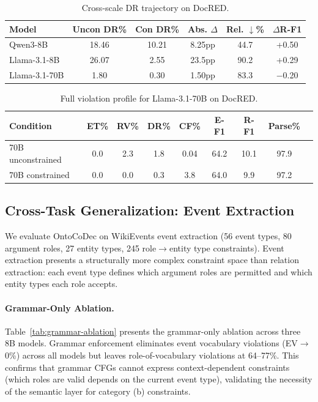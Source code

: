 \documentclass[11pt,a4paper]{article}
\begin{document}
\begin{table}[t]
\centering
\caption{Cross-scale DR trajectory on DocRED.}
\label{tab:70b-docred-trajectory}
\small
\begin{tabular}{lccccc}
\toprule
Model & Uncon DR\% & Con DR\% & Abs. $\Delta$ & Rel. $\downarrow$\% & $\Delta$R-F1 \\
\midrule
Qwen3-8B & 18.46 & 10.21 & 8.25pp & 44.7 & +0.50 \\
Llama-3.1-8B & 26.07 & 2.55 & 23.5pp & 90.2 & +0.29 \\
Llama-3.1-70B & 1.80 & 0.30 & 1.50pp & 83.3 & $-$0.20 \\
\bottomrule
\end{tabular}
\end{table}

\begin{table}[t]
\centering
\caption{Full violation profile for Llama-3.1-70B on DocRED.}
\label{tab:70b-docred-profile}
\small
\begin{tabular}{lcccccccc}
\toprule
Condition & ET\% & RV\% & DR\% & CF\% & E-F1 & R-F1 & Parse\% \\
\midrule
70B unconstrained & 0.0 & 2.3 & 1.8 & 0.04 & 64.2 & 10.1 & 97.9 \\
70B constrained & 0.0 & 0.0 & 0.3 & 3.8 & 64.0 & 9.9 & 97.2 \\
\bottomrule
\end{tabular}
\end{table}

\subsection{Cross-Task Generalization: Event Extraction}
\label{sec:ee}

We evaluate OntoCoDec on WikiEvents event extraction (56 event types, 80 argument roles, 27 entity types, 245 role$\to$entity type constraints). Event extraction presents a structurally more complex constraint space than relation extraction: each event type defines which argument roles are permitted and which entity types each role accepts.

\paragraph{Grammar-Only Ablation.}
Table~\ref{tab:grammar-ablation} presents the grammar-only ablation across three 8B models. Grammar enforcement eliminates event vocabulary violations (EV$\to$0\%) across all models but leaves role-of-vocabulary violations at 64--77\%. This confirms that grammar CFGs cannot express context-dependent constraints (which roles are valid depends on the current event type), validating the necessity of the semantic layer for category (b) constraints.
\end{document}
